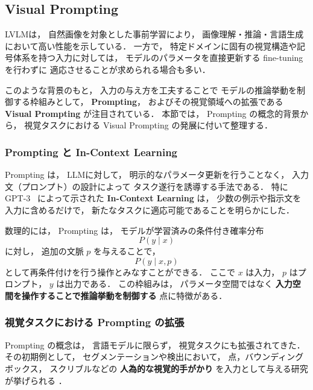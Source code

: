 \documentclass[a4j,12pt,dvipdfmx]{jsreport}
\begin{document}
\subsection{Visual Prompting}
\label{sec:visual_prompting}

LVLMは，
自然画像を対象とした事前学習により，
画像理解・推論・言語生成において高い性能を示している．
一方で，
特定ドメインに固有の視覚構造や記号体系を持つ入力に対しては，
モデルのパラメータを直接更新する fine-tuning を行わずに
適応させることが求められる場合も多い．

このような背景のもと，
入力の与え方を工夫することで
モデルの推論挙動を制御する枠組みとして，
\textbf{Prompting}，
およびその視覚領域への拡張である
\textbf{Visual Prompting}
が注目されている．
本節では，
Prompting の概念的背景から，
視覚タスクにおける Visual Prompting の発展に付いて整理する．

\subsubsection{Prompting と In-Context Learning}

Prompting は，
LLMに対して，
明示的なパラメータ更新を行うことなく，
入力文（プロンプト）の設計によって
タスク遂行を誘導する手法である．
特に GPT-3~\cite{brown2020language} によって示された
\textbf{In-Context Learning} は，
少数の例示や指示文を入力に含めるだけで，
新たなタスクに適応可能であることを明らかにした．

数理的には，
Prompting は，
モデルが学習済みの条件付き確率分布
\begin{equation}
   P(y \mid x)
\end{equation}
に対し，
追加の文脈 $p$ を与えることで，
\begin{equation}
   P(y \mid x, p)
\end{equation}
として再条件付けを行う操作とみなすことができる．
ここで $x$ は入力，
$p$ はプロンプト，
$y$ は出力である．
この枠組みは，
パラメータ空間ではなく
\textbf{入力空間を操作することで推論挙動を制御する}
点に特徴がある．

\subsubsection{視覚タスクにおける Prompting の拡張}

Prompting の概念は，
言語モデルに限らず，
視覚タスクにも拡張されてきた．
その初期例として，
セグメンテーションや検出において，
点，バウンディングボックス，
スクリブルなどの
\textbf{人為的な視覚的手がかり}
を入力として与える研究が挙げられる
\cite{xu2016deepgrabcut,maninis2018deep}．
\end{document}
